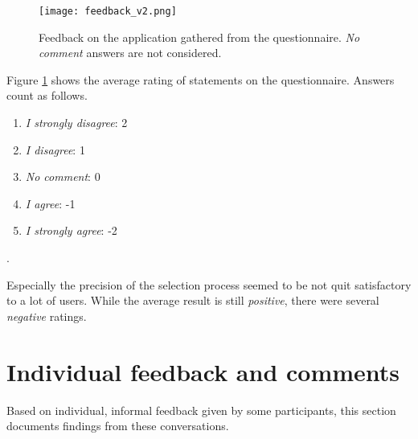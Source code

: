 \begin{figure}[h]
	\centering
	\texttt{[image: feedback\_v2.png]}\\ %
	\caption{Feedback on the application gathered from the questionnaire. \textit{No comment} answers are not considered.}
	\label{fig:feedback_questionnaire}
\end{figure}

Figure \ref{fig:feedback_questionnaire} shows the average rating of statements on the questionnaire. Answers count as follows.

\begin{enumerate}
	\item \textit{I strongly disagree}: 2
	\item \textit{I disagree}: 1
	\item \textit{No comment}: 0
	\item \textit{I agree}: -1
	\item \textit{I strongly agree}: -2
\end{enumerate}.

Especially the precision of the selection process seemed to be not quit satisfactory to a lot of users. While the average result is still \textit{positive}, there were several \textit{negative} ratings. 

	\section{Individual feedback and comments}
	\label{sec:individual_feedback_and_comments}
Based on individual, informal feedback given by some participants, this section documents findings from these conversations.


